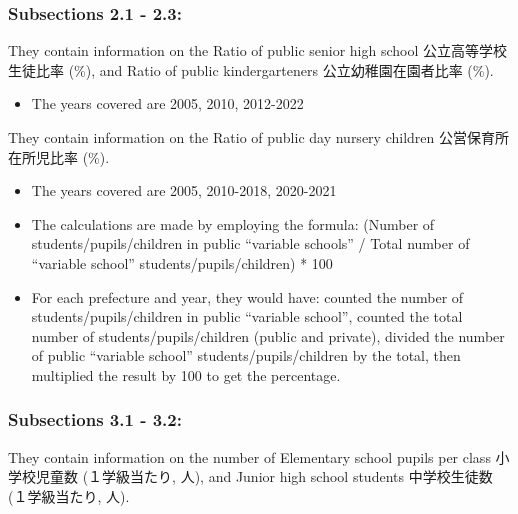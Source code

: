 \documentclass[
]{ltjarticle}
\providecommand{\tightlist}{%
  \setlength{\itemsep}{0pt}\setlength{\parskip}{0pt}}\usepackage{longtable,booktabs,array}
\begin{document}
\hypertarget{subsections-2.1---2.3-1}{%
\subsubsection{Subsections 2.1 - 2.3:}\label{subsections-2.1---2.3-1}}

They contain information on the Ratio of public senior high school
公立高等学校生徒比率 (\%), and Ratio of public kindergarteners
公立幼稚園在園者比率 (\%).

\begin{itemize}
\tightlist
\item
  The years covered are 2005, 2010, 2012-2022
\end{itemize}

They contain information on the Ratio of public day nursery children
公営保育所在所児比率 (\%).

\begin{itemize}
\item
  The years covered are 2005, 2010-2018, 2020-2021
\item
  The calculations are made by employing the formula: (Number of
  students/pupils/children in public ``variable schools'' / Total number
  of ``variable school'' students/pupils/children) * 100
\item
  For each prefecture and year, they would have: counted the number of
  students/pupils/children in public ``variable school'', counted the
  total number of students/pupils/children (public and private), divided
  the number of public ``variable school'' students/pupils/children by
  the total, then multiplied the result by 100 to get the percentage.
\end{itemize}

\hypertarget{subsections-3.1---3.2}{%
\subsubsection{Subsections 3.1 - 3.2:}\label{subsections-3.1---3.2}}

They contain information on the number of Elementary school pupils per
class 小学校児童数 (１学級当たり, 人), and Junior high school students
中学校生徒数 (１学級当たり, 人).
\end{document}
